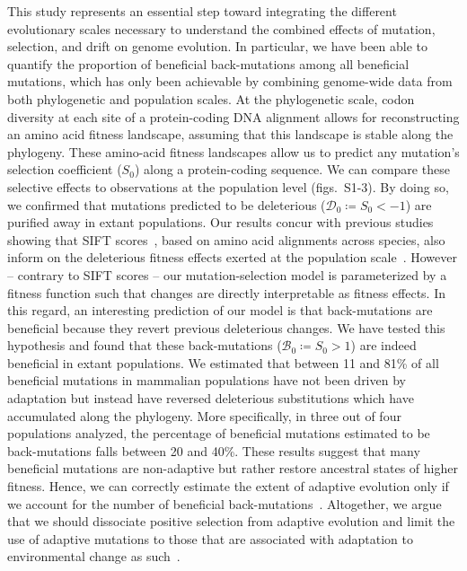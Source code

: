 \documentclass{article}
\newcommand{\Sphy}{S_{0}}
\newcommand{\SphyDel}{\mathcal{D}_0}
\newcommand{\SphyBen}{\mathcal{B}_0}
\begin{document}
    This study represents an essential step toward integrating the different evolutionary scales necessary to understand the combined effects of mutation, selection, and drift on genome evolution.
    In particular, we have been able to quantify the proportion of beneficial back-mutations among all beneficial mutations, which has only been achievable by combining genome-wide data from both phylogenetic and population scales.
    At the phylogenetic scale, codon diversity at each site of a protein-coding DNA alignment allows for reconstructing an amino acid fitness landscape, assuming that this landscape is stable along the phylogeny.
    These amino-acid fitness landscapes allow us to predict any mutation’s selection coefficient ($\Sphy$) along a protein-coding sequence.
    We can compare these selective effects to observations at the population level (figs.~S1-3).
    By doing so, we confirmed that mutations predicted to be deleterious ($\SphyDel \coloneqq \Sphy < -1$) are purified away in extant populations.
    Our results concur with previous studies showing that SIFT scores~\cite{ng_sift_2003, vaser_sift_2016}, based on amino acid alignments across species, also inform on the deleterious fitness effects exerted at the population scale~\cite{chen_hunting_2021}.
    However – contrary to SIFT scores – our mutation-selection model is parameterized by a fitness function such that changes are directly interpretable as fitness effects.
    In this regard, an interesting prediction of our model is that back-mutations are beneficial because they revert previous deleterious changes.
    We have tested this hypothesis and found that these back-mutations ($\SphyBen \coloneqq \Sphy > 1 $) are indeed beneficial in extant populations.
    We estimated that between 11 and 81\% of all beneficial mutations in mammalian populations have not been driven by adaptation but instead have reversed deleterious substitutions which have accumulated along the phylogeny.
    More specifically, in three out of four populations analyzed, the percentage of beneficial mutations estimated to be back-mutations falls between 20 and 40\%.
    These results suggest that many beneficial mutations are non-adaptive but rather restore ancestral states of higher fitness.
    Hence, we can correctly estimate the extent of adaptive evolution only if we account for the number of beneficial back-mutations~\cite{keightley_what_2010, rice_evolutionarily_2015}.
    Altogether, we argue that we should dissociate positive selection from adaptive evolution and limit the use of adaptive mutations to those that are associated with adaptation to environmental change as such~\cite{charlesworth_other_2007, mustonen_fitness_2009}.
\end{document}
